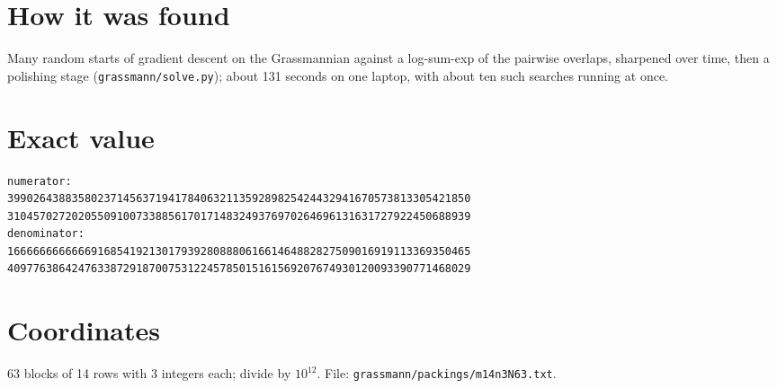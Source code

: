 \documentclass[11pt,a4paper]{article}
\begin{document}
\section{How it was found}
Many random starts of gradient descent on the Grassmannian against a log-sum-exp of the pairwise overlaps, sharpened over time, then a polishing stage (\texttt{grassmann/solve.py}); about 131 seconds on one laptop, with about ten such searches running at once.


\appendix
\section{Exact value}
{\small
\begin{verbatim}
numerator:
399026438835802371456371941784063211359289825424432941670573813305421850
310457027202055091007338856170171483249376970264696131631727922450688939
denominator:
166666666666691685419213017939280888061661464882827509016919113369350465
409776386424763387291870075312245785015161569207674930120093390771468029
\end{verbatim}}

\section{Coordinates}
63 blocks of 14 rows with 3 integers each; divide by $10^{12}$. File: \texttt{grassmann/packings/m14n3N63.txt}.
{\tiny
\begin{multicols}{3}
\end{multicols}}
\end{document}
